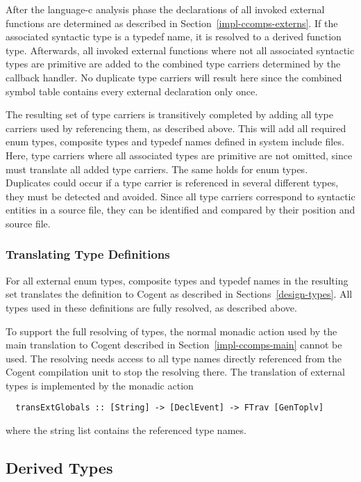 After the language-c analysis phase the declarations of all invoked external functions are determined 
as described in Section~\ref{impl-ccomps-externs}. If the associated syntactic type is a typedef name, it is resolved
to a derived function type. Afterwards, all invoked external functions where not all associated syntactic types
are primitive are added to the combined type carriers determined by the callback handler. No duplicate type carriers
will result here since the combined symbol table contains every external declaration only once.

The resulting set of type carriers is transitively completed by adding all type carriers used by referencing them,
as described above. This will add all required enum types, composite types and typedef names defined in system include files.
Here, type carriers where all associated types are primitive are not omitted, since 
 must translate all added type carriers. The same holds for enum types. 
Duplicates could occur if a type carrier is referenced
in several different types, they must be detected and avoided. Since all type carriers correspond to 
syntactic entities in a source file, they can be identified and compared by their position and source file.

\subsubsection{Translating Type Definitions}

For all external enum types, composite types and typedef names in the resulting set  translates the
definition to Cogent as described in Sections~\ref{design-types}.
All types used in these definitions are fully resolved, as described above.

To support the full resolving of types, the normal monadic action  used by the main translation 
to Cogent described in Section~\ref{impl-ccomps-main} cannot be used. The resolving needs access to all
type names directly referenced from the Cogent compilation unit to stop the resolving there.
The translation of external types is implemented by the monadic action 
\begin{verbatim}
  transExtGlobals :: [String] -> [DeclEvent] -> FTrav [GenToplv]
\end{verbatim}
where the string list contains the referenced type names.

\subsection{Derived Types}
\label{impl-ccomps-dvdtypes}

